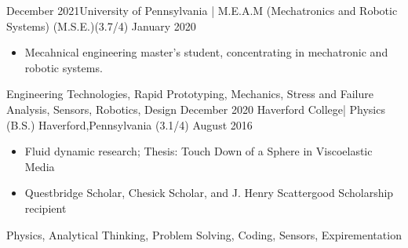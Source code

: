 %
%
%


\begin{experiences}
 \experience
    {December 2021}{University of Pennsylvania | M.E.A.M  (Mechatronics and Robotic Systems) }{(M.S.E.)}{(3.7/4)}
    {January 2020} {
                      \begin{itemize}
                        \item Mecahnical engineering 	master's student, concentrating in mechatronic and robotic systems.                                                                            
                      \end{itemize}
                    }
                     {Engineering Technologies, Rapid Prototyping, Mechanics, Stress and Failure Analysis, Sensors, Robotics, Design}
  \emptySeparator
  \experience
    {December 2020}   {Haverford College| Physics (B.S.) }{Haverford,Pennsylvania }{(3.1/4)}
    {August 2016} {
                      \begin{itemize}
    			    \item Fluid dynamic research; Thesis: Touch Down of a Sphere in Viscoelastic Media     	
                        \item Questbridge Scholar, Chesick Scholar, and  J. Henry Scattergood Scholarship recipient                                                        
                      \end{itemize}
                    }
                     {Physics, Analytical Thinking, Problem Solving, Coding, Sensors, Expirementation}
  \emptySeparator
 
\end{experiences}

